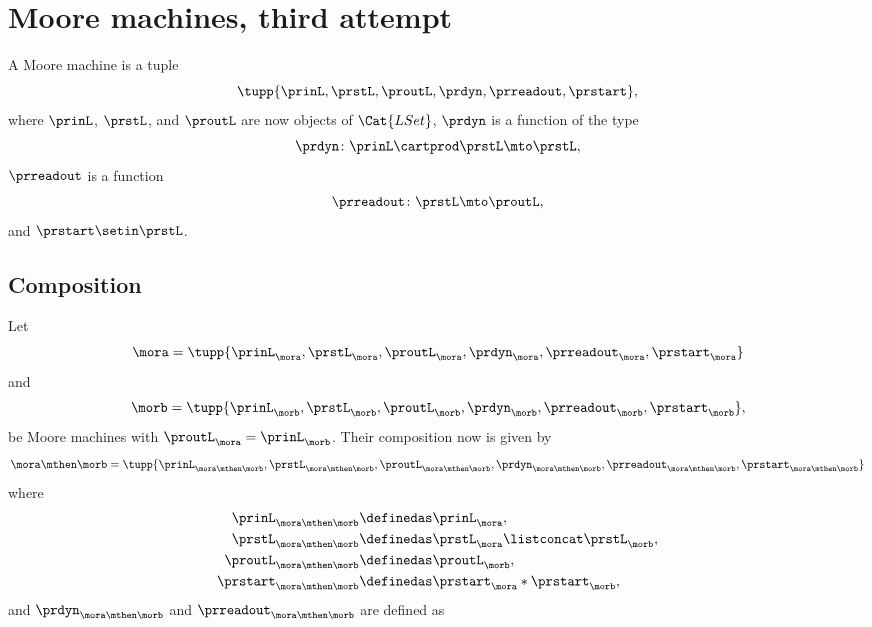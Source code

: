 
\section{Moore machines, third attempt}

\begin{definition}
    \label{def:moore_machine_3rd}
    A Moore machine is a tuple
    \begin{equation}
        \label{eq:moore-tuple-improved-again}
        \tupp{\prinL,\prstL,\proutL,\prdyn,\prreadout,\prstart},
    \end{equation}
    where $\prinL$, $\prstL$, and $\proutL$ are now objects of $\Cat{LSet}$, $\prdyn$ is a function of the type
    \begin{equation}
        \prdyn \colon \prinL \cartprod \prstL \mto \prstL,
    \end{equation}
    $\prreadout$ is a function
    \begin{equation}
        \prreadout \colon \prstL \mto \proutL,
    \end{equation}
    and $\prstart \setin \prstL$.
\end{definition}

\subsection{Composition}

Let
\begin{equation}
    \label{eq:moore-mora-3rd}
    \mora = \tupp{\prinL_{\mora},\prstL_{\mora},\proutL_{\mora},\prdyn_{\mora},\prreadout_{\mora},\prstart_{\mora}}
\end{equation}
%
and
%
\begin{equation}
    \label{eq:moore-morb-3rd}
    \morb = \tupp{\prinL_{\morb},\prstL_{\morb},\proutL_{\morb},\prdyn_{\morb},\prreadout_{\morb},\prstart_{\morb}},
\end{equation}
be Moore machines with $\proutL_{\mora} = \prinL_{\morb}$.
Their composition now is given by
\begin{equation}
    \mora \mthen \morb = \tupp{\prinL_{\mora \mthen \morb},\prstL_{\mora \mthen \morb},\proutL_{\mora \mthen \morb},\prdyn_{\mora \mthen \morb},\prreadout_{\mora \mthen \morb},\prstart_{\mora \mthen \morb}}
\end{equation}
where
%
\begin{equation}
    \label{eq:moore-comp-3rd-1}
    \begin{aligned}
        \prinL_{\mora\mthen\morb}   & \definedas \prinL_{\mora}, \\
        \prstL_{\mora\mthen\morb}   & \definedas \prstL_{\mora} \listconcat  \prstL_{\morb}, \\
        \proutL_{\mora\mthen\morb}  & \definedas \proutL_{\morb}, \\
        \prstart_{\mora\mthen\morb} & \definedas \prstart_{\mora} * \prstart_{\morb},
    \end{aligned}
\end{equation}
and $\prdyn_{\mora \mthen \morb}$ and $\prreadout_{\mora \mthen \morb}$ are defined as

